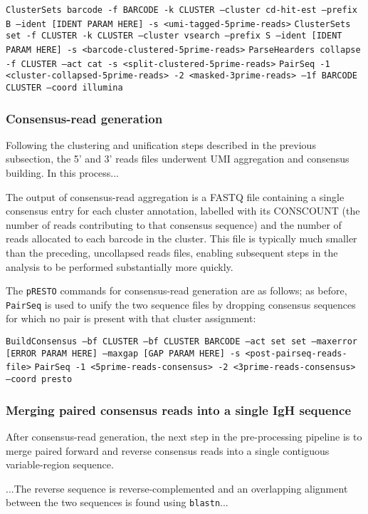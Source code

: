 \texttt{ClusterSets barcode -f BARCODE -k CLUSTER --cluster cd-hit-est --prefix B --ident [IDENT PARAM HERE] -s <umi-tagged-5prime-reads>}
\texttt{ClusterSets set -f CLUSTER -k CLUSTER --cluster vsearch --prefix S --ident [IDENT PARAM HERE] -s <barcode-clustered-5prime-reads>}
\texttt{ParseHearders collapse -f CLUSTER --act cat -s <split-clustered-5prime-reads>}
\texttt{PairSeq -1 <cluster-collapsed-5prime-reads> -2 <masked-3prime-reads> --1f BARCODE CLUSTER --coord illumina}

\subsubsection{Consensus-read generation}

Following the clustering and unification steps described in the previous subsection, the 5' and 3' reads files underwent UMI aggregation and consensus building. In this process... %

The output of consensus-read aggregation is a FASTQ file containing a single consensus entry for each cluster annotation, labelled with its CONSCOUNT (the number of reads contributing to that consensus sequence) and the number of reads allocated to each barcode in the cluster. This file is typically much smaller than the preceding, uncollapsed reads files, enabling subsequent steps in the analysis to be performed substantially more quickly.

The \texttt{pRESTO} commands for consensus-read generation are as follows; as before, \texttt{PairSeq} is used to unify the two sequence files by dropping consensus sequences for which no pair is present with that cluster assignment:

\texttt{BuildConsensus --bf CLUSTER --bf CLUSTER BARCODE --act set set --maxerror [ERROR PARAM HERE] --maxgap [GAP PARAM HERE] -s <post-pairseq-reads-file>}
\texttt{PairSeq -1 <5prime-reads-consensus> -2 <3prime-reads-consensus> --coord presto}

\subsubsection{Merging paired consensus reads into a single IgH sequence}

After consensus-read generation, the next step in the pre-processing pipeline is to merge paired forward and reverse consensus reads into a single contiguous variable-region sequence. 

...The reverse sequence is reverse-complemented and an overlapping alignment between the two sequences is found using \texttt{blastn}... %

